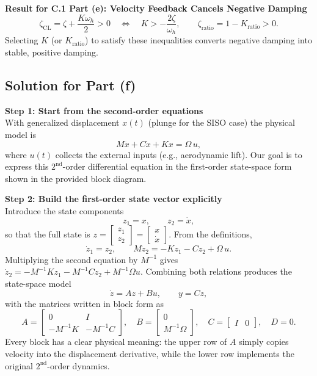 \documentclass[12pt]{article}
\begin{document}
\begin{resultsbox}
\textbf{Result for C.1 Part (e): Velocity Feedback Cancels Negative Damping}\\[0.5em]
\[
\zeta_{\text{CL}} = \zeta + \frac{K\omega_h}{2} > 0 \quad\Longleftrightarrow\quad K > -\frac{2\zeta}{\omega_h},
\qquad
\zeta_{\text{ratio}} = 1 - K_{\text{ratio}} > 0.
\]
Selecting $K$ (or $K_{\text{ratio}}$) to satisfy these inequalities converts negative damping into stable, positive damping.
\end{resultsbox}

\clearpage
\subsection*{Solution for Part (f)}

\begin{stepbox}
\textbf{Step 1: Start from the second-order equations}\\[0.5em]
With generalized displacement $x(t)$ (plunge for the SISO case) the physical model is
\[
M\ddot{x} + C\dot{x} + Kx = \Omega\,u,
\]
where $u(t)$ collects the external inputs (e.g., aerodynamic lift).  Our goal is to express this \(2^{\text{nd}}\)-order differential equation in the first-order state-space form shown in the provided block diagram.
\end{stepbox}

\begin{stepbox}
\textbf{Step 2: Build the first-order state vector explicitly}\\[0.5em]
Introduce the state components
\[
z_1 = x, \qquad z_2 = \dot{x},
\]
so that the full state is \(z = \begin{bmatrix} z_1 \\ z_2 \end{bmatrix} = \begin{bmatrix} x \\ \dot{x} \end{bmatrix}\).
From the definitions,
\[
\dot{z}_1 = z_2, \qquad
M\dot{z}_2 = -K z_1 - C z_2 + \Omega\,u.
\]
Multiplying the second equation by \(M^{-1}\) gives \(\dot{z}_2 = -M^{-1}K z_1 - M^{-1}C z_2 + M^{-1}\Omega u\).
Combining both relations produces the state-space model
\[
\dot{z} = A z + B u,\qquad y = C z,
\]
with the matrices written in block form as
\[
A = \begin{bmatrix} 0 & I \\ -M^{-1}K & -M^{-1}C \end{bmatrix},\quad
B = \begin{bmatrix} 0 \\ M^{-1}\Omega \end{bmatrix},\quad
C = \begin{bmatrix} I & 0 \end{bmatrix},\quad
D = 0.
\]
Every block has a clear physical meaning: the upper row of \(A\) simply copies velocity into the displacement derivative, while the lower row implements the original \(2^{\text{nd}}\)-order dynamics.
\end{stepbox}
\end{document}
